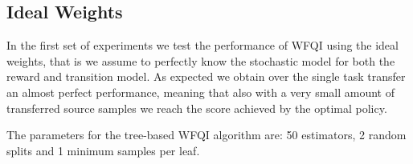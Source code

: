     \subsection{Ideal Weights}
    \noindent In the first set of experiments we test the performance of WFQI using the ideal weights,
    that is we assume to perfectly know the stochastic model for both the reward and transition model.
    As expected we obtain over the single task transfer an almost perfect performance, meaning that also
    with a very small amount of transferred source samples we reach the score achieved by the optimal policy.\newline

    \noindent The parameters for the tree-based WFQI algorithm are: 50 estimators, 2 random splits and 1 minimum samples per leaf.


